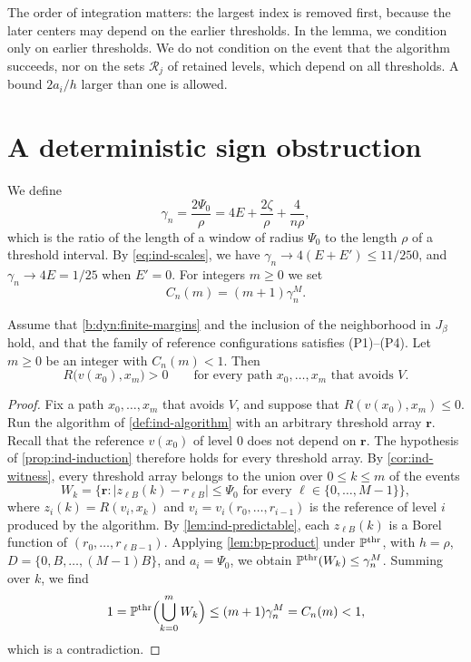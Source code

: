 The order of integration matters: the largest index is removed first, because the later centers may depend on the earlier thresholds. In the lemma, we condition only on earlier thresholds. We do not condition on the event that the algorithm succeeds, nor on the sets $\mathcal R_j$ of retained levels, which depend on all thresholds. A bound $2a_i/h$ larger than one is allowed.

\section{A deterministic sign obstruction}\label{sec:bp-obstruction}

We define
\begin{equation}\label{b:dyn:window-weights}
 \gamma_n=\frac{2\Psi_0}{\rho}=4E+\frac{2\zeta}{\rho}+\frac4{n\rho},
\end{equation}
which is the ratio of the length of a window of radius $\Psi_0$ to the length $\rho$ of a threshold interval. By \eqref{eq:ind-scales}, we have $\gamma_n\to4(E+E')\le11/250$, and $\gamma_n\to4E=1/25$ when $E'=0$. For integers $m\ge0$ we set
\begin{equation}\label{b:dyn:prefix-count}
 C_n(m)=(m+1)\gamma_n^M.
\end{equation}

\begin{proposition}\label{prop:bp-obstruction}
Assume that \eqref{b:dyn:finite-margins} and the inclusion of the neighborhood in $J_\beta$ hold, and that the family of reference configurations satisfies (P1)--(P4). Let $m\ge0$ be an integer with $C_n(m)<1$. Then
\begin{equation}\label{b:dyn:deterministic-obstruction}
 R\bigl(v(x_0),x_m\bigr)>0\qquad\text{for every path }x_0,\dots,x_m\text{ that avoids }V.
\end{equation}
\end{proposition}

\begin{proof}
Fix a path $x_0,\dots,x_m$ that avoids $V$, and suppose that $R(v(x_0),x_m)\le0$. Run the algorithm of \cref{def:ind-algorithm} with an arbitrary threshold array $\mathbf r$. Recall that the reference $v(x_0)$ of level $0$ does not depend on $\mathbf r$. The hypothesis of \cref{prop:ind-induction} therefore holds for every threshold array. By \cref{cor:ind-witness}, every threshold array belongs to the union over $0\le k\le m$ of the events
\[
 W_k=\bigl\{\mathbf r:|z_{\ell B}(k)-r_{\ell B}|\le\Psi_0\text{ for every }\ell\in\{0,\dots,M-1\}\bigr\},
\]
where $z_i(k)=R(v_i,x_k)$ and $v_i=v_i(r_0,\dots,r_{i-1})$ is the reference of level $i$ produced by the algorithm. By \cref{lem:ind-predictable}, each $z_{\ell B}(k)$ is a Borel function of $(r_0,\dots,r_{\ell B-1})$. Applying \cref{lem:bp-product} under $\mathbb P^{\rm thr}$, with $h=\rho$, $D=\{0,B,\dots,(M-1)B\}$, and $a_i=\Psi_0$, we obtain $\mathbb P^{\rm thr}(W_k)\le\gamma_n^M$. Summing over $k$, we find
\[
 1=\mathbb P^{\rm thr}\Bigl(\bigcup_{k=0}^mW_k\Bigr)\le(m+1)\gamma_n^M=C_n(m)<1,
\]
which is a contradiction.
\end{proof}

